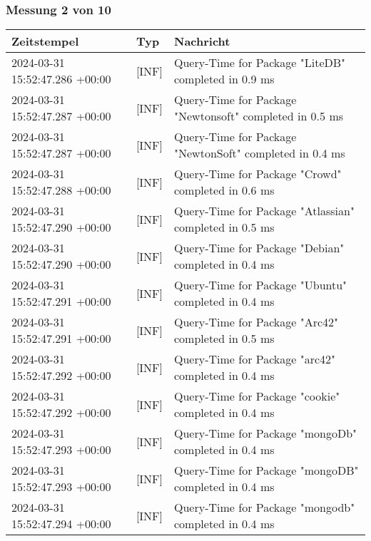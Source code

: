     \subsubsection*{Messung 2 von 10} \label{subsubsec:MySQLMitIndex2von10}
        {
            {\small
                \begin{tabularx}{\textwidth}{|l|l|X|}
                    \hline
                    \textbf{Zeitstempel} & \textbf{Typ} & \textbf{Nachricht} \\
                    \hline
                    \endhead
                    2024-03-31 15:52:47.286 +00:00 & [INF] & Query-Time for Package "LiteDB" completed in 0.9 ms \\
                    2024-03-31 15:52:47.287 +00:00 & [INF] & Query-Time for Package "Newtonsoft" completed in 0.5 ms \\
                    2024-03-31 15:52:47.287 +00:00 & [INF] & Query-Time for Package "NewtonSoft" completed in 0.4 ms \\
                    2024-03-31 15:52:47.288 +00:00 & [INF] & Query-Time for Package "Crowd" completed in 0.6 ms \\
                    2024-03-31 15:52:47.290 +00:00 & [INF] & Query-Time for Package "Atlassian" completed in 0.5 ms \\
                    2024-03-31 15:52:47.290 +00:00 & [INF] & Query-Time for Package "Debian" completed in 0.4 ms \\
                    2024-03-31 15:52:47.291 +00:00 & [INF] & Query-Time for Package "Ubuntu" completed in 0.4 ms \\
                    2024-03-31 15:52:47.291 +00:00 & [INF] & Query-Time for Package "Arc42" completed in 0.5 ms \\
                    2024-03-31 15:52:47.292 +00:00 & [INF] & Query-Time for Package "arc42" completed in 0.4 ms \\
                    2024-03-31 15:52:47.292 +00:00 & [INF] & Query-Time for Package "cookie" completed in 0.4 ms \\
                    2024-03-31 15:52:47.293 +00:00 & [INF] & Query-Time for Package "mongoDb" completed in 0.4 ms \\
                    2024-03-31 15:52:47.293 +00:00 & [INF] & Query-Time for Package "mongoDB" completed in 0.4 ms \\
                    2024-03-31 15:52:47.294 +00:00 & [INF] & Query-Time for Package "mongodb" completed in 0.4 ms \\

\end{tabularx}}}
